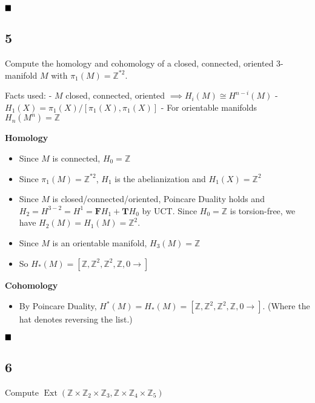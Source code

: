 \(\hfill\blacksquare\)

\hypertarget{section-9}{%
\subsection{5}\label{section-9}}

Compute the homology and cohomology of a closed, connected, oriented
3-manifold \(M\) with \(\pi_1(M) = {\mathbb{Z}}^{\ast 2}\).

Facts used: - \(M\) closed, connected, oriented
\(\implies H_i(M)\cong H^{n-i}(M)\) -
\(H_1(X) = \pi_1(X) / [\pi_1(X), \pi_1(X)]\) - For orientable manifolds
\(H_n(M^n) = {\mathbb{Z}}\)

\textbf{Homology}

\begin{itemize}
\tightlist
\item
  Since \(M\) is connected, \(H_0 = {\mathbb{Z}}\)
\item
  Since \(\pi_1(M) = {\mathbb{Z}}^{\ast 2}\), \(H_1\) is the
  abelianization and \(H_1(X) = {\mathbb{Z}}^2\)
\item
  Since \(M\) is closed/connected/oriented, Poincare Duality holds and
  \(H_2 = H^{3-2} = H^1 = \mathbf{F} H_1 + \mathbf{T}H_0\) by UCT. Since
  \(H_0={\mathbb{Z}}\) is torsion-free, we have
  \(H_2(M) = H_1(M) = {\mathbb{Z}}^2\).
\item
  Since \(M\) is an orientable manifold, \(H_3(M) = {\mathbb{Z}}\)
\item
  So
  \(H_*(M) = [{\mathbb{Z}}, {\mathbb{Z}}^2, {\mathbb{Z}}^2, {\mathbb{Z}}, 0\rightarrow]\)
\end{itemize}

\textbf{Cohomology}

\begin{itemize}
\tightlist
\item
  By Poincare Duality,
  \(H^*(M) = \widehat{H_*(M)} = [{\mathbb{Z}}, {\mathbb{Z}}^2, {\mathbb{Z}}^2, {\mathbb{Z}}, 0\rightarrow]\).
  (Where the hat denotes reversing the list.)
\end{itemize}

\(\hfill\blacksquare\)

\hypertarget{section-10}{%
\subsection{6}\label{section-10}}

Compute
\(\operatorname{Ext}({\mathbb{Z}}\times {\mathbb{Z}}_2 \times {\mathbb{Z}}_3, {\mathbb{Z}}\times {\mathbb{Z}}_4 \times {\mathbb{Z}}_5)\)

